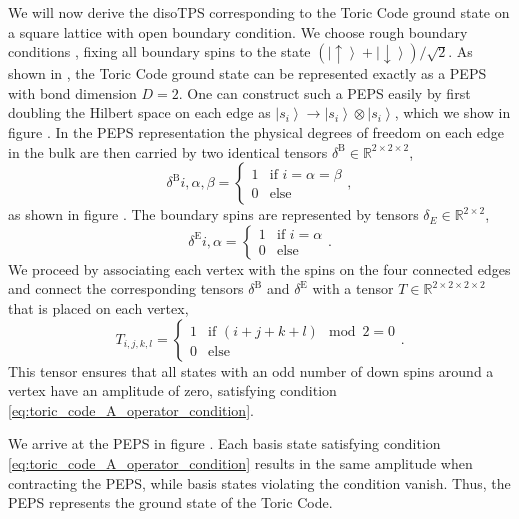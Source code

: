 We will now derive the disoTPS corresponding to the Toric Code ground state on a square lattice with open boundary condition. We choose rough boundary conditions \cite{cite:models_for_gapped_boundaries_and_domain_walls}, fixing all boundary spins to the state $\left(\left|\uparrow\right\rangle + \left|\downarrow\right\rangle\right)/\sqrt{2}$. As shown in \cite{cite:isometric_tensor_network_representation_of_string_net_liquids}, the Toric Code ground state can be represented exactly as a PEPS with bond dimension $D = 2$. One can construct such a PEPS easily by first doubling the Hilbert space on each edge as $\left|s_i\right\rangle \rightarrow \left|s_i\right\rangle\otimes\left|s_i\right\rangle$, which we show in figure . In the PEPS representation the physical degrees of freedom on each edge in the bulk are then carried by two identical tensors $\delta^\text{B}\in\mathbb{R}^{2\times2\times2}$,
\begin{equation}
	\delta^\text{B}{i,\alpha,\beta} = \begin{cases}
		1 &\text{if }i=\alpha=\beta\\
		0 &\text{else}
	\end{cases},
\end{equation}
as shown in figure . The boundary spins are represented by tensors $\delta_E\in\mathbb{R}^{2\times2}$,
\begin{equation}
	\delta^\text{E}{i,\alpha} = \begin{cases}
		1 &\text{if }i=\alpha\\
		0 &\text{else}
	\end{cases}.
\end{equation}
We proceed by associating each vertex with the spins on the four connected edges and connect the corresponding tensors $\delta^\text{B}$ and $\delta^\text{E}$ with a tensor $T\in\mathbb{R}^{2\times2\times2\times2}$ that is placed on each vertex,
\begin{equation}
	T_{i,j,k,l} = \begin{cases}
		1 & \text{if } \left(i+j+k+l\right)\mod2 = 0 \\
		0 & \text{else}
	\end{cases}.
\end{equation}
This tensor ensures that all states with an odd number of down spins around a vertex have an amplitude of zero, satisfying condition \eqref{eq:toric_code_A_operator_condition}. \par
We arrive at the PEPS in figure . Each basis state satisfying condition \eqref{eq:toric_code_A_operator_condition} results in the same amplitude when contracting the PEPS, while basis states violating the condition vanish. Thus, the PEPS represents the ground state of the Toric Code. \par
